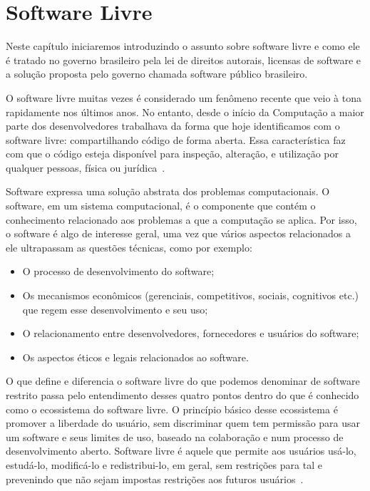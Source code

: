 \chapter[Software Livre]{Software Livre}
\label{software_livre}

Neste capítulo iniciaremos introduzindo o assunto sobre software livre e como ele é
tratado no governo brasileiro pela lei de direitos autorais, licensas de software e 
a solução proposta pelo governo chamada software público brasileiro. 

O software livre muitas vezes é considerado um fenômeno recente que veio à tona
rapidamente nos últimos anos. No entanto, desde o início da Computação a maior parte
dos desenvolvedores trabalhava da forma que hoje identificamos com o software livre:
compartilhando código de forma aberta. Essa característica 
faz com que o código esteja disponível para inspeção, alteração, e utilização por qualquer
pessoas, física ou jurídica~\cite{kon2012software, Hippel:2003:OSS:970521.970585}.

Software expressa uma solução abstrata dos problemas computacionais. O software, em um
sistema computacional, é o componente que contém o conhecimento relacionado aos problemas a
que a computação se aplica. Por isso, o software é algo de interesse geral, uma vez que vários
aspectos relacionados a ele ultrapassam as questões técnicas, como por exemplo:

\begin{itemize}

\item O processo de desenvolvimento do software;

\item Os mecanismos econômicos (gerenciais, competitivos, sociais, cognitivos etc.) que regem esse
desenvolvimento e seu uso;

\item O relacionamento entre desenvolvedores, fornecedores e usuários do software;

\item Os aspectos éticos e legais relacionados ao software.

\end{itemize}

O que define e diferencia o software livre do que podemos denominar de software restrito passa
pelo entendimento desses quatro pontos dentro do que é conhecido como o ecossistema do 
software livre. O princípio básico desse ecossistema é promover a liberdade do 
usuário, sem discriminar quem tem permissão para usar um software e seus limites 
de uso, baseado na colaboração e num processo de desenvolvimento aberto. Software 
livre é aquele que permite aos usuários usá-lo, estudá-lo, modificá-lo e redistribui-lo, 
em geral, sem restrições para tal e prevenindo que não sejam impostas restrições aos 
futuros usuários~\cite{meirelles2013metrics}.


